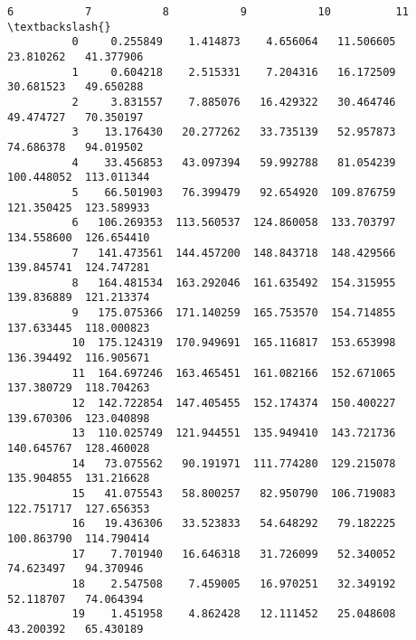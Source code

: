 \documentclass[11pt]{article}
\begin{document}
\begin{Verbatim}[commandchars=\\\{\}]
                      6           7           8           9           10          11  \textbackslash{}
          0     0.255849    1.414873    4.656064   11.506605   23.810262   41.377906   
          1     0.604218    2.515331    7.204316   16.172509   30.681523   49.650288   
          2     3.831557    7.885076   16.429322   30.464746   49.474727   70.350197   
          3    13.176430   20.277262   33.735139   52.957873   74.686378   94.019502   
          4    33.456853   43.097394   59.992788   81.054239  100.448052  113.011344   
          5    66.501903   76.399479   92.654920  109.876759  121.350425  123.589933   
          6   106.269353  113.560537  124.860058  133.703797  134.558600  126.654410   
          7   141.473561  144.457200  148.843718  148.429566  139.845741  124.747281   
          8   164.481534  163.292046  161.635492  154.315955  139.836889  121.213374   
          9   175.075366  171.140259  165.753570  154.714855  137.633445  118.000823   
          10  175.124319  170.949691  165.116817  153.653998  136.394492  116.905671   
          11  164.697246  163.465451  161.082166  152.671065  137.380729  118.704263   
          12  142.722854  147.405455  152.174374  150.400227  139.670306  123.040898   
          13  110.025749  121.944551  135.949410  143.721736  140.645767  128.460028   
          14   73.075562   90.191971  111.774280  129.215078  135.904855  131.216628   
          15   41.075543   58.800257   82.950790  106.719083  122.751717  127.656353   
          16   19.436306   33.523833   54.648292   79.182225  100.863790  114.790414   
          17    7.701940   16.646318   31.726099   52.340052   74.623497   94.370946   
          18    2.547508    7.459005   16.970251   32.349192   52.118707   74.064394   
          19    1.451958    4.862428   12.111452   25.048608   43.200392   65.430189   
          

\end{Verbatim}
\end{document}
